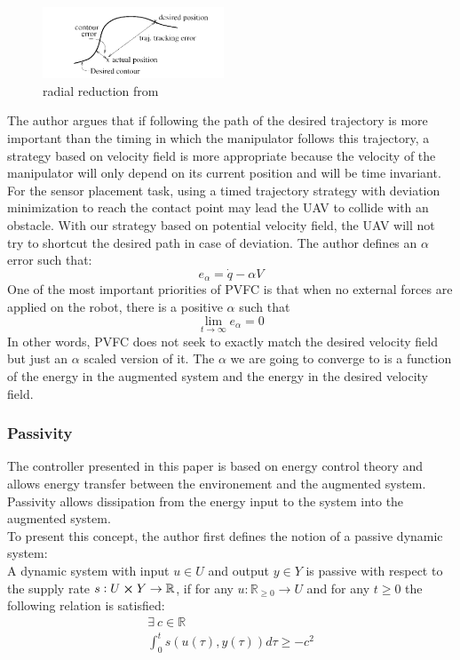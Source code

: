 \begin{figure}[h!]
    \centering
    \includegraphics[width=0.48\textwidth]{Images/radialreduction.png}
    \caption{radial reduction from \cite{li1999passive}}
    \label{fig:radialreduction}
\end{figure} 
The author argues that if following the path of the desired trajectory is more important than the timing in which the manipulator follows this trajectory, a strategy based on velocity field is more appropriate because the velocity of the manipulator will only depend on its current position and will be time invariant.  
For the sensor placement task, using a timed trajectory strategy with deviation minimization to reach the contact point may lead the UAV to collide with an obstacle. With our strategy based on potential velocity field, the UAV will not try to shortcut the desired path in case of deviation.
The author defines an $\alpha$ error such that:
\begin{equation}
    e_{\alpha} = \dot{q} - \alpha V
\end{equation}
One of the most important priorities of PVFC is that when no external forces are applied on the robot, there is a positive $\alpha$ such that 
\begin{equation}
    \lim_{t\to\infty}e_{\alpha} = 0
\end{equation}
In other words, PVFC does not seek to exactly match the desired velocity field but just an $\alpha$ scaled version of it. The $\alpha$ we are going to converge to is a function of the energy in the augmented system and the energy in the desired velocity field.
\subsubsection{Passivity}
The controller presented in this paper is based on energy control theory and allows energy transfer between the environement and the augmented system.
Passivity allows dissipation from the energy input to the system into the augmented system. \\
To present this concept, the author first defines the notion of a passive dynamic system:\\
A dynamic system with input $u \in U$ and output $y \in Y$ is passive with respect to the supply rate 
$s:U \cross Y \rightarrow \mathbb R$, if for any $u: \mathbb R_{\ge 0} \rightarrow U $ and for any $t\geq 0$ the following relation is satisfied:
\begin{align}
    \exists ~ c\in\mathbb R  \nonumber\\
    \int_{0}^{t}s(u(\tau),y(\tau))d\tau \geq -c^2 \label{passivityCondition}
\end{align}

